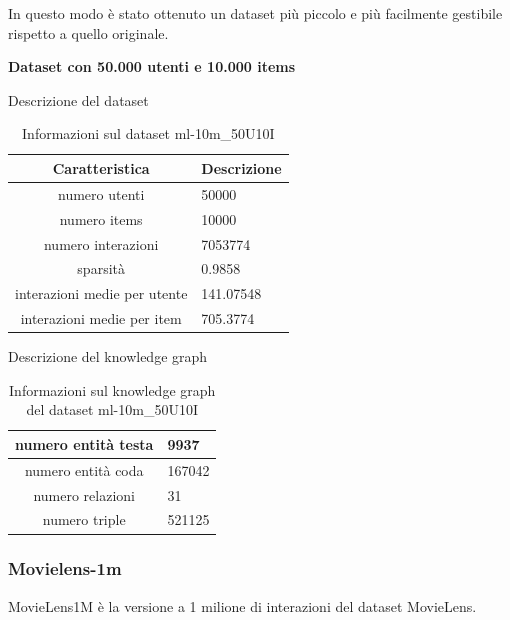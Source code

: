 \noindent In questo modo è stato ottenuto un dataset più piccolo e più facilmente gestibile rispetto a quello originale.

\noindent\textbf{Dataset con 50.000 utenti e 10.000 items}

\noindent Descrizione del dataset
\begin{table}[H]
    \centering
    \footnotesize
    \begin{tabularx}{\textwidth}{|c|X|}
        \hline
        \textbf{Caratteristica} & \textbf{Descrizione} \\
        \hline
        numero utenti & 50000 \\
        \hline
        numero items & 10000 \\
        \hline
        numero interazioni & 7053774 \\
        \hline
        sparsità & 0.9858 \\
        \hline
        interazioni medie per utente & 141.07548 \\
        \hline
        interazioni medie per item & 705.3774 \\
        \hline
    \end{tabularx}
    \caption{Informazioni sul dataset ml-10m\_50U10I}
    \label{tab:dataset_info}
\end{table}


\noindent Descrizione del knowledge graph
\begin{table}[H]
    \centering
    \footnotesize
    \begin{tabularx}{\textwidth}{|c|X|}
        \hline
        numero entità testa & 9937 \\
        \hline
        numero entità coda & 167042 \\
        \hline
        numero relazioni & 31 \\
        \hline
        numero triple & 521125 \\
        \hline
    \end{tabularx}
    \caption{Informazioni sul knowledge graph del dataset ml-10m\_50U10I}
    \label{tab:dataset_info}
\end{table}


\subsubsection{Movielens-1m}

\noindent MovieLens1M è la versione a 1 milione di interazioni del dataset MovieLens.


